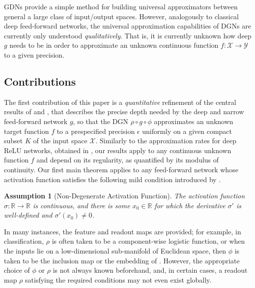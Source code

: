 \documentclass[anon,12pt]{colt2021} %
\newcommand{\rr}{{\mathbb{R}}}
\newcommand{\xxx}{\mathcal{X}}
\newcommand{\yyy}{\mathcal{Y}}
\newtheorem{assumption}{Assumption}
\begin{document}
GDNs provide a simple method for building universal approximators between general a large class of input/output spaces.  However, analogously to classical deep feed-forward networks, the universal approximation capabilities of DGNs are currently only understood \textit{qualitatively}.  That is, it is currently unknown how deep $g$ needs to be in order to approximate an unknown continuous function $f:\xxx\rightarrow \yyy$ to a given precision.  

\subsection{Contributions}\label{ss_intro_contributions}  
The first contribution of this paper is a \textit{quantitative} refinement of the central results of \cite{kidger2019universal} and \cite{kratsios2020non}, that describes the precise depth needed by the deep and narrow feed-forward network $g$, so that the DGN $\rho\circ g\circ \phi$ approximates an unknown target function $f$ to a prespecified precision $\epsilon$ uniformly on a given compact subset $K$ of the input space $\xxx$.  Similarly to the approximation rates for deep ReLU networks, obtained in \cite{pmlrv75yarotsky18a}, our results apply to any continuous unknown function $f$ and depend on its regularity, as quantified by its modulus of continuity.  Our first main theorem applies to any feed-forward network whose activation function satisfies the following mild condition introduced by \cite{kidger2019universal}.   
\begin{assumption}[Non-Degenerate Activation Function]\label{ass_Kidger_Lyons_Condition}
The activation function $\sigma:\rr\rightarrow \rr$ is continuous, and there is some $x_0 \in \rr$ for which the derivative $\sigma'$ is well-defined and $\sigma'(x_0)\neq 0$.  
\end{assumption}

In many instances, the feature and readout maps are provided; for example, in classification, $\rho$ is often taken to be a component-wise logistic function, or when the inputs lie on a low-dimensional sub-manifold of Euclidean space, then $\phi$ is taken to be the inclusion map or the embedding of \cite{NashJohn}.  However, the appropriate choice of $\phi$ or $\rho$ is not always known beforehand, and, in certain cases, a readout map $\rho$ satisfying the required conditions may not even exist globally.  
\end{document}
